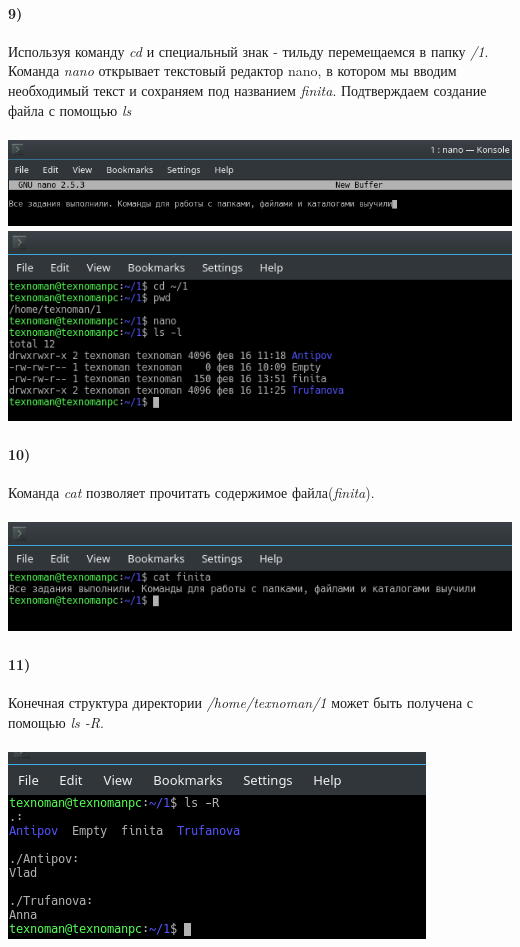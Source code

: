 	\paragraph{9)}
	Используя команду \textit{cd} и специальный знак - тильду перемещаемся в папку \textit{/1}. 
	Команда \textit{nano} открывает текстовый редактор nano,  в котором мы вводим необходимый текст и сохраняем под названием \textit{finita}. Подтверждаем создание файла с помощью \textit{ls}\\
	\\
	\includegraphics[width=\textwidth]{11.png}
	\\
	\includegraphics[width=\textwidth]{12.png}
	\\

	\paragraph{10)}
	Команда \textit{cat} позволяет прочитать содержимое файла(\textit{finita}).\\
	\\
	
	\includegraphics[width=\textwidth]{13.png}
	\\
	
	\paragraph{11)}
	Конечная структура директории \textit{/home/texnoman/1} может быть получена с помощью \textit{ls -R}.\\
	\\
	\includegraphics[width=\textwidth]{14.png}
	\\